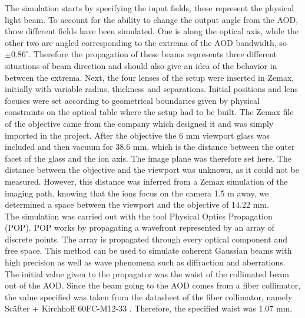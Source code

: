 The simulation starts by specifying the input fields, these represent the physical light beam. To account for the ability to change the output angle from the AOD, three different fields have been simulated. One is along the optical axis, while the other two are angled corresponding to the extrema of the AOD bandwidth, so $\pm0.86^{\circ}$. Therefore the propagation of these beams represents three different situations of beam direction and should also give an idea of the behavior in between the extrema. Next, the four lenses of the setup were inserted in Zemax, initially with variable radius, thickness and separations. Initial positions and lens focuses were set according to geometrical boundaries given by physical constraints on the optical table where the setup had to be built. The Zemax file of the objective came from the company which designed it and was simply imported in the project. After the objective the 6 mm viewport glass was included and then vacuum for 38.6 mm, which is the distance between the outer facet of the glass and the ion axis. The image plane was therefore set here. The distance between the objective and the viewport was unknown, as it could not be measured. However, this distance was inferred from a Zemax simulation of the imaging path, knowing that the ions focus on the camera 1.5 m away, we determined a space between the viewport and the objective of 14.22 mm.\\
The simulation was carried out with the tool Physical Optics Propagation (POP). POP works by propagating a wavefront represented by an array of discrete points. The array is propagated through every optical component and free space. This method can be used to simulate coherent Gaussian beams with high precision as well as wave phenomena such as diffraction and aberrations. The initial value given to the propagator was the waist of the collimated beam out of the AOD. Since the beam going to the AOD comes from a fiber collimator, the value specified was taken from the datasheet of the fiber collimator, namely Sc\"after + Kirchhoff 60FC-M12-33 \cite{fibercollimator}. Therefore, the specified waist was 1.07 mm.
